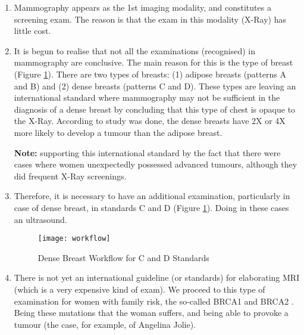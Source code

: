 \begin{enumerate}

\item Mammography appears as the 1st imaging modality, and constitutes a screening exam. The reason is that the exam in this modality (X-Ray) has little cost.

\item It is begun to realise that not all the examinations (recognised) in mammography are conclusive. The main reason for this is the type of breast (Figure \ref{fig:workflow}). There are two types \cite{nothacker2009early, rhodes2011dedicated} of breasts: (1) adipose breasts (patterns A and B) and (2) dense breasts (patterns C and D). These types are leaving an international standard where mammography may not be sufficient in the diagnosis of a dense breast by concluding that this type of chest is opaque to the X-Ray. According to study was done, the dense breasts have 2X or 4X more likely to develop a tumour than the adipose breast.

\hfill

\textbf{Note:} supporting this international standard by the fact that there were cases where women unexpectedly possessed advanced tumours, although they did frequent X-Ray screenings.

\hfill

\item Therefore, it is necessary to have an additional examination, particularly in case of dense breast, in standards C and D (Figure \ref{fig:workflow}). Doing in these cases an ultrasound.


\hfill

\begin{figure}[h]
\centering
\texttt{[image: workflow]}
\caption{Dense Breast Workflow \cite{workflow} for C and D Standards}
\label{fig:workflow}
\end{figure}

\hfill


\item There is not yet an international guideline (or standards) for elaborating MRI (which is a very expensive kind of exam). We proceed to this type of examination for women with family risk, the so-called BRCA1 and BRCA2 \cite{chen2007meta}. Being these mutations that the woman suffers, and being able to provoke a tumour (the case, for example, of Angelina Jolie).


\end{enumerate}
